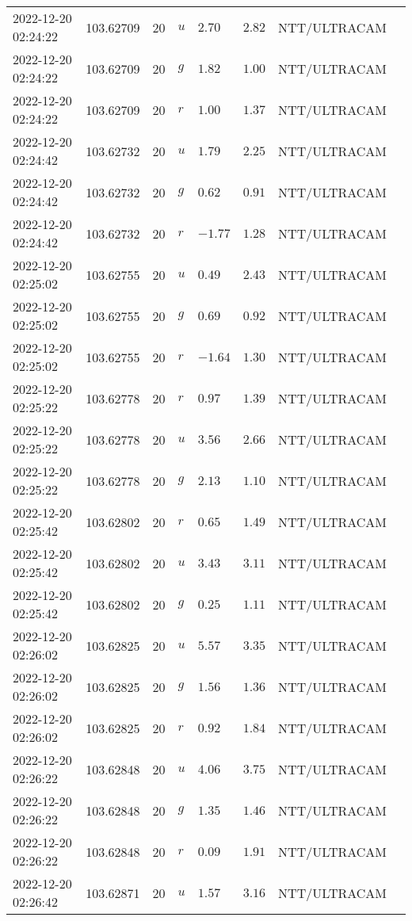 \documentclass{nature_plusfigure}
\begin{document}
\begin{supplement}
\begin{center}
\begin{longtable}{llllllll}
2022-12-20 02:24:22 & 103.62709 & 20 & $u$ & $2.70$ & $2.82$ & NTT/ULTRACAM &  \\ 
2022-12-20 02:24:22 & 103.62709 & 20 & $g$ & $1.82$ & $1.00$ & NTT/ULTRACAM &  \\ 
2022-12-20 02:24:22 & 103.62709 & 20 & $r$ & $1.00$ & $1.37$ & NTT/ULTRACAM &  \\ 
2022-12-20 02:24:42 & 103.62732 & 20 & $u$ & $1.79$ & $2.25$ & NTT/ULTRACAM &  \\ 
2022-12-20 02:24:42 & 103.62732 & 20 & $g$ & $0.62$ & $0.91$ & NTT/ULTRACAM &  \\ 
2022-12-20 02:24:42 & 103.62732 & 20 & $r$ & $-1.77$ & $1.28$ & NTT/ULTRACAM &  \\ 
2022-12-20 02:25:02 & 103.62755 & 20 & $u$ & $0.49$ & $2.43$ & NTT/ULTRACAM &  \\ 
2022-12-20 02:25:02 & 103.62755 & 20 & $g$ & $0.69$ & $0.92$ & NTT/ULTRACAM &  \\ 
2022-12-20 02:25:02 & 103.62755 & 20 & $r$ & $-1.64$ & $1.30$ & NTT/ULTRACAM &  \\ 
2022-12-20 02:25:22 & 103.62778 & 20 & $r$ & $0.97$ & $1.39$ & NTT/ULTRACAM &  \\ 
2022-12-20 02:25:22 & 103.62778 & 20 & $u$ & $3.56$ & $2.66$ & NTT/ULTRACAM &  \\ 
2022-12-20 02:25:22 & 103.62778 & 20 & $g$ & $2.13$ & $1.10$ & NTT/ULTRACAM &  \\ 
2022-12-20 02:25:42 & 103.62802 & 20 & $r$ & $0.65$ & $1.49$ & NTT/ULTRACAM &  \\ 
2022-12-20 02:25:42 & 103.62802 & 20 & $u$ & $3.43$ & $3.11$ & NTT/ULTRACAM &  \\ 
2022-12-20 02:25:42 & 103.62802 & 20 & $g$ & $0.25$ & $1.11$ & NTT/ULTRACAM &  \\ 
2022-12-20 02:26:02 & 103.62825 & 20 & $u$ & $5.57$ & $3.35$ & NTT/ULTRACAM &  \\ 
2022-12-20 02:26:02 & 103.62825 & 20 & $g$ & $1.56$ & $1.36$ & NTT/ULTRACAM &  \\ 
2022-12-20 02:26:02 & 103.62825 & 20 & $r$ & $0.92$ & $1.84$ & NTT/ULTRACAM &  \\ 
2022-12-20 02:26:22 & 103.62848 & 20 & $u$ & $4.06$ & $3.75$ & NTT/ULTRACAM &  \\ 
2022-12-20 02:26:22 & 103.62848 & 20 & $g$ & $1.35$ & $1.46$ & NTT/ULTRACAM &  \\ 
2022-12-20 02:26:22 & 103.62848 & 20 & $r$ & $0.09$ & $1.91$ & NTT/ULTRACAM &  \\ 
2022-12-20 02:26:42 & 103.62871 & 20 & $u$ & $1.57$ & $3.16$ & NTT/ULTRACAM &  \\ 

\end{longtable}
\end{center}
\end{supplement}
\end{document}
